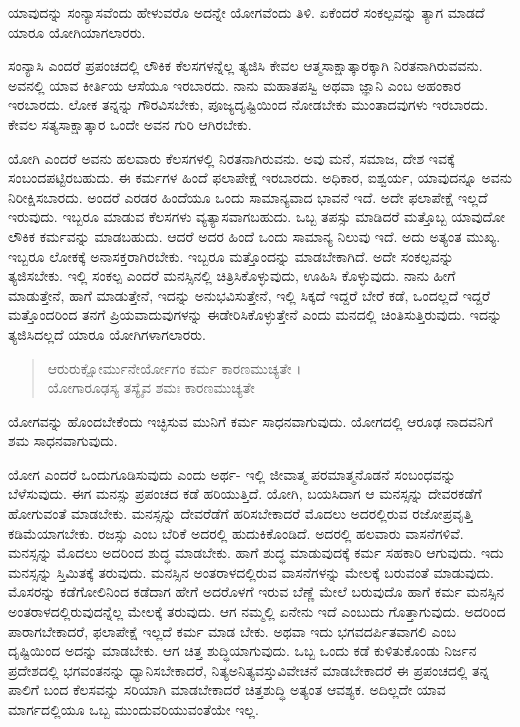 {\small ಯಾವುದನ್ನು ಸಂನ್ಯಾಸವೆಂದು ಹೇಳುವರೊ ಅದನ್ನೇ ಯೋಗವೆಂದು ತಿಳಿ. ಏಕೆಂದರೆ ಸಂಕಲ್ಪವನ್ನು ತ್ಯಾಗ ಮಾಡದೆ ಯಾರೂ ಯೋಗಿಯಾಗಲಾರರು.}

ಸಂನ್ಯಾಸಿ ಎಂದರೆ ಪ್ರಪಂಚದಲ್ಲಿ ಲೌಕಿಕ ಕೆಲಸಗಳನ್ನೆಲ್ಲ ತ್ಯಜಿಸಿ ಕೇವಲ ಆತ್ಮಸಾಕ್ಷಾತ್ಕಾರಕ್ಕಾಗಿ ನಿರತನಾಗಿರುವವನು. ಅವನಲ್ಲಿ ಯಾವ ಕೀರ್ತಿಯ ಆಸೆಯೂ ಇರಬಾರದು. ನಾನು ಮಹಾತಪಸ್ವಿ ಅಥವಾ ಜ್ಞಾನಿ ಎಂಬ ಅಹಂಕಾರ ಇರಬಾರದು. ಲೋಕ ತನ್ನನ್ನು ಗೌರವಿಸಬೇಕು, ಪೂಜ್ಯದೃಷ್ಟಿಯಿಂದ ನೋಡಬೇಕು ಮುಂತಾದವುಗಳು ಇರಬಾರದು. ಕೇವಲ ಸತ್ಯಸಾಕ್ಷಾತ್ಕಾರ ಒಂದೇ ಅವನ ಗುರಿ ಆಗಿರಬೇಕು.

ಯೋಗಿ ಎಂದರೆ ಅವನು ಹಲವಾರು ಕೆಲಸಗಳಲ್ಲಿ ನಿರತನಾಗಿರುವನು. ಅವು ಮನೆ, ಸಮಾಜ, ದೇಶ ಇವಕ್ಕೆ ಸಂಬಂದಪಟ್ಟಿರಬಹುದು. ಈ ಕರ್ಮಗಳ ಹಿಂದೆ ಫಲಾಪೇಕ್ಷೆ ಇರಬಾರದು. ಅಧಿಕಾರ, ಐಶ್ವರ್ಯ, ಯಾವುದನ್ನೂ ಅವನು ನಿರೀಕ್ಷಿಸಬಾರದು. ಅಂದರೆ ಎರಡರ ಹಿಂದೆಯೂ ಒಂದು ಸಾಮಾನ್ಯವಾದ ಭಾವನೆ ಇದೆ. ಅದೇ ಫಲಾಪೇಕ್ಷೆ ಇಲ್ಲದೆ ಇರುವುದು. ಇಬ್ಬರೂ ಮಾಡುವ ಕೆಲಸಗಳು ವ್ಯತ್ಯಾಸವಾಗಬಹುದು. ಒಬ್ಬ ತಪಸ್ಸು ಮಾಡಿದರೆ ಮತ್ತೊಬ್ಬ ಯಾವುದೋ ಲೌಕಿಕ ಕರ್ಮವನ್ನು ಮಾಡಬಹುದು. ಆದರೆ ಅದರ ಹಿಂದೆ ಒಂದು ಸಾಮಾನ್ಯ ನಿಲುವು ಇದೆ. ಅದು ಅತ್ಯಂತ ಮುಖ್ಯ. ಇಬ್ಬರೂ ಲೋಕಕ್ಕೆ ಅನಾಸಕ್ತರಾಗಿರಬೇಕು. ಇಬ್ಬರೂ ಮತ್ತೊಂದನ್ನು ಮಾಡಬೇಕಾಗಿದೆ. ಅದೇ ಸಂಕಲ್ಪವನ್ನು ತ್ಯಜಿಸಬೇಕು. ಇಲ್ಲಿ ಸಂಕಲ್ಪ ಎಂದರೆ ಮನಸ್ಸಿನಲ್ಲಿ ಚಿತ್ರಿಸಿಕೊಳ್ಳುವುದು, ಊಹಿಸಿ ಕೊಳ್ಳುವುದು. ನಾನು ಹೀಗೆ ಮಾಡುತ್ತೇನೆ, ಹಾಗೆ ಮಾಡುತ್ತೇನೆ, ಇದನ್ನು ಅನುಭವಿಸುತ್ತೇನೆ, ಇಲ್ಲಿ ಸಿಕ್ಕದೆ ಇದ್ದರೆ ಬೇರೆ ಕಡೆ, ಒಂದಲ್ಲದೆ ಇದ್ದರೆ ಮತ್ತೊಂದರಿಂದ ತನಗೆ ಪ್ರಿಯವಾದುವುಗಳನ್ನು ಈಡೇರಿಸಿಕೊಳ್ಳುತ್ತೇನೆ ಎಂದು ಮನದಲ್ಲಿ ಚಿಂತಿಸುತ್ತಿರುವುದು. ಇದನ್ನು ತ್ಯಜಿಸಿದಲ್ಲದೆ ಯಾರೂ ಯೋಗಿಗಳಾಗಲಾರರು.

\begin{verse}
ಆರುರುಕ್ಷೋರ್ಮುನೇರ್ಯೋಗಂ ಕರ್ಮ ಕಾರಣಮುಚ್ಯತೇ ।\\ಯೋಗಾರೂಢಸ್ಯ ತಸ್ಯೈವ ಶಮಃ ಕಾರಣಮುಚ್ಯತೇ 
\end{verse}

{\small ಯೋಗವನ್ನು ಹೊಂದಬೇಕೆಂದು ಇಚ್ಛಿಸುವ ಮುನಿಗೆ ಕರ್ಮ ಸಾಧನವಾಗುವುದು. ಯೋಗದಲ್ಲಿ ಆರೂಢ ನಾದವನಿಗೆ ಶಮ ಸಾಧನವಾಗುವುದು.}

ಯೋಗ ಎಂದರೆ ಒಂದುಗೂಡಿಸುವುದು ಎಂದು ಅರ್ಥ- ಇಲ್ಲಿ ಜೀವಾತ್ಮ ಪರಮಾತ್ಮನೊಡನೆ ಸಂಬಂಧವನ್ನು ಬೆಳೆಸುವುದು. ಈಗ ಮನಸ್ಸು ಪ್ರಪಂಚದ ಕಡೆ ಹರಿಯುತ್ತಿದೆ. ಯೋಗಿ, ಬಯಸಿದಾಗ ಆ ಮನಸ್ಸನ್ನು ದೇವರಕಡೆಗೆ ಹೋಗುವಂತೆ ಮಾಡಬೇಕು. ಮನಸ್ಸನ್ನು ದೇವರೆಡೆಗೆ ಹರಿಸಬೇಕಾದರೆ ಮೊದಲು ಅದರಲ್ಲಿರುವ ರಜೋಪ್ರವೃತ್ತಿ ಕಡಿಮೆಯಾಗಬೇಕು. ರಜಸ್ಸು ಎಂಬ ಬೆರಿಕೆ ಅದರಲ್ಲಿ ಹುದುಕಿಕೊಂಡಿದೆ. ಅದರಲ್ಲಿ ಹಲವಾರು ವಾಸನೆಗಳಿವೆ. ಮನಸ್ಸನ್ನು ಮೊದಲು ಅದರಿಂದ ಶುದ್ಧ ಮಾಡಬೇಕು. ಹಾಗೆ ಶುದ್ಧ ಮಾಡುವುದಕ್ಕೆ ಕರ್ಮ ಸಹಕಾರಿ ಆಗುವುದು. ಇದು ಮನಸ್ಸನ್ನು ಸ್ತಿಮಿತಕ್ಕೆ ತರುವುದು. ಮನಸ್ಸಿನ ಅಂತರಾಳದಲ್ಲಿರುವ ವಾಸನೆಗಳನ್ನು ಮೇಲಕ್ಕೆ ಬರುವಂತೆ ಮಾಡುವುದು. ಮೊಸರನ್ನು ಕಡೆಗೋಲಿನಿಂದ ಕಡೆದಾಗ ಹೇಗೆ ಅದರೊಳಗೆ ಇರುವ ಬೆಣ್ಣೆ ಮೇಲೆ ಬರುವುದೊ ಹಾಗೆ ಕರ್ಮ ಮನಸ್ಸಿನ ಅಂತರಾಳದಲ್ಲಿರುವುದನ್ನೆಲ್ಲ ಮೇಲಕ್ಕೆ ತರುವುದು. ಆಗ ನಮ್ಮಲ್ಲಿ ಏನೇನು ಇದೆ ಎಂಬುದು ಗೊತ್ತಾಗುವುದು. ಅದರಿಂದ ಪಾರಾಗಬೇಕಾದರೆ, ಫಲಾಪೇಕ್ಷೆ ಇಲ್ಲದೆ ಕರ್ಮ ಮಾಡ ಬೇಕು. ಅಥವಾ ಇದು ಭಗವದರ್ಪಿತವಾಗಲಿ ಎಂಬ ದೃಷ್ಟಿಯಿಂದ ಅದನ್ನು ಮಾಡಬೇಕು. ಆಗ ಚಿತ್ತ ಶುದ್ಧಿಯಾಗುವುದು. ಒಬ್ಬ ಒಂದು ಕಡೆ ಕುಳಿತುಕೊಂಡು ನಿರ್ಜನ ಪ್ರದೇಶದಲ್ಲಿ ಭಗವಂತನನ್ನು ಧ್ಯಾನಿಸಬೇಕಾದರೆ, ನಿತ್ಯಅನಿತ್ಯವಸ್ತುವಿವೇಚನೆ ಮಾಡಬೇಕಾದರೆ ಈ ಪ್ರಪಂಚದಲ್ಲಿ ತನ್ನ ಪಾಲಿಗೆ ಬಂದ ಕೆಲಸವನ್ನು ಸರಿಯಾಗಿ ಮಾಡಬೇಕಾದರೆ ಚಿತ್ತಶುದ್ಧಿ ಅತ್ಯಂತ ಆವಶ್ಯಕ. ಅದಿಲ್ಲದೇ ಯಾವ ಮಾರ್ಗದಲ್ಲಿಯೂ ಒಬ್ಬ ಮುಂದುವರಿಯುವಂತೆಯೇ ಇಲ್ಲ.

